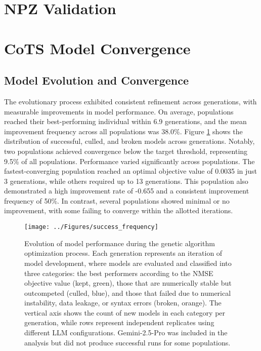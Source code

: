 \section{NPZ Validation}
\label{sec:npz_validation}



\section{CoTS Model Convergence}
\label{sec:convergence}
    
\subsection{Model Evolution and Convergence}
The evolutionary process exhibited consistent refinement across generations, with measurable improvements in model performance. On average, populations reached their best-performing individual within 6.9 generations, and the mean improvement frequency across all populations was 38.0\%. Figure \ref{fig:status_distribution} shows the distribution of successful, culled, and broken models across generations. Notably, two populations achieved convergence below the target threshold, representing 9.5\% of all populations.
Performance varied significantly across populations. The fastest-converging population reached an optimal objective value of 0.0035 in just 3 generations, while others required up to 13 generations. This population also demonstrated a high improvement rate of -0.655 and a consistent improvement frequency of 50\%. In contrast, several populations showed minimal or no improvement, with some failing to converge within the allotted iterations.
\begin{figure}[H]
\centering
\texttt{[image: ../Figures/success\_frequency]}
\caption{Evolution of model performance during the genetic algorithm optimization process. Each generation represents an iteration of model development, where models are evaluated and classified into three categories: the best performers according to the NMSE objective value (kept, green), those that are numerically stable but outcompeted (culled, blue), and those that failed due to numerical instability, data leakage, or syntax errors (broken, orange). The vertical axis shows the count of new models in each category per generation, while rows represent independent replicates using different LLM configurations. Gemini-2.5-Pro was included in the analysis but did not produce successful runs for some populations.}
\label{fig:status_distribution}
\end{figure}


